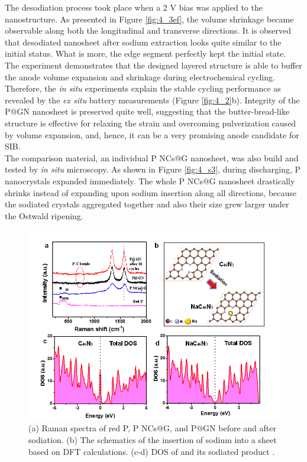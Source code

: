 The desodiation process took place when a 2 V bias was applied to the nanostructure. As presented in Figure \ref{fig:4_3ef}, the volume shrinkage became observable along both the longitudinal and transverse directions. 
It is observed that desodiated nanosheet after sodium extraction looks quite similar to the initial status. What is more, the edge segment perfectly kept the initial state. 
The experiment demonstrates that the designed layered structure is able to buffer the anode volume expansion and shrinkage during electrochemical cycling. 
Therefore, the {\em in situ} experiments explain the stable cycling performance as revealed by the {\em ex situ} battery measurements (Figure \ref{fig:4_2}b). 
Integrity of the P@GN nanosheet is preserved quite well, suggesting that the butter-bread-like structure is effective for relaxing the strain and overcoming pulverization caused by volume expansion, and, hence, it can be a very promising anode candidate for SIB.\\

The comparison material, an individual P NCs@G nanosheet, was also build and tested by {\em in situ} microscopy. 
As shown in Figure \ref{fig:4_s3}, during discharging, P nanocrystals expanded immediately. 
The whole P NCs@G nanosheet drastically shrinks instead of expanding upon sodium insertion along all directions, because the sodiated crystals aggregated together and also their size grew larger under the Ostwald ripening. \\

\begin{figure}  
\includegraphics[width=\textwidth]{figures/figure4_4}
\caption[Raman spectra and DFT calculations]
{
(a) Raman spectra of red P, P NCs@G, and P@GN before and after sodiation. 
(b) The schematics of the insertion of sodium into a  sheet based on DFT calculations. 
(c-d) DOS of  and its sodiated product .
\label{fig:4_4}}
\end{figure}

